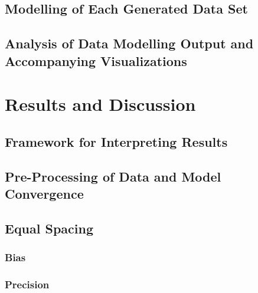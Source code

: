 \documentclass[
12pt, %
twoside,
english]{guelphthesis}
\begin{document}
\hypertarget{data-modelling-exp2}{%
\subsection{Modelling of Each Generated Data Set}\label{data-modelling-exp2}}

\hypertarget{analysis-of-data-modelling-output-and-accompanying-visualizations}{%
\subsection{Analysis of Data Modelling Output and Accompanying Visualizations}\label{analysis-of-data-modelling-output-and-accompanying-visualizations}}

\hypertarget{results-and-discussion-1}{%
\section{Results and Discussion}\label{results-and-discussion-1}}

\hypertarget{framework-for-interpreting-results-1}{%
\subsection{Framework for Interpreting Results}\label{framework-for-interpreting-results-1}}

\hypertarget{pre-processing-of-data-and-model-convergence-1}{%
\subsection{Pre-Processing of Data and Model Convergence}\label{pre-processing-of-data-and-model-convergence-1}}

\hypertarget{concise-example}{%
\subsection{Equal Spacing}\label{concise-example}}

\hypertarget{bias-equal-exp2}{%
\subsubsection{Bias}\label{bias-equal-exp2}}

\hypertarget{precision-equal-exp2}{%
\subsubsection{Precision}\label{precision-equal-exp2}}
\end{document}
